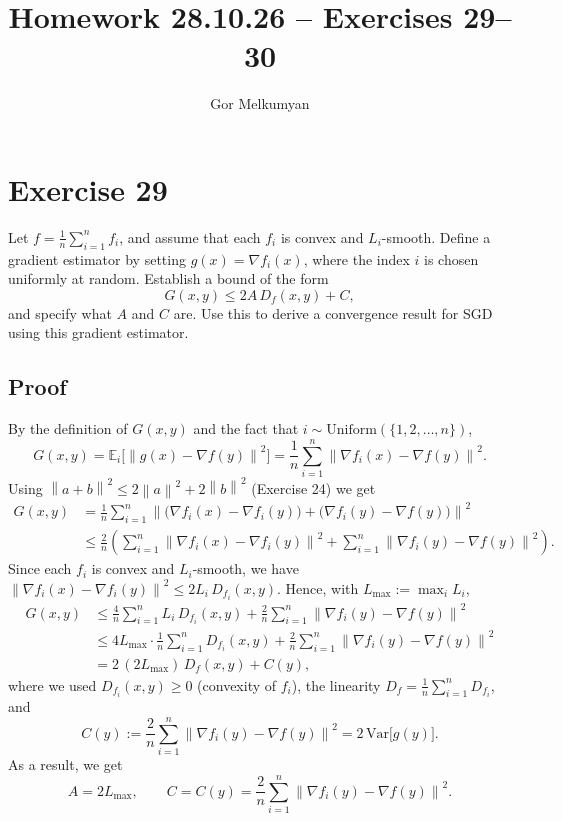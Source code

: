 \documentclass[11pt,a4paper]{article}
\title{Homework 28.10.26 -- Exercises 29--30}
\author{Gor Melkumyan}
\date{}
\newcommand{\E}{\mathbb{E}}
\newcommand{\norm}[1]{\left\| #1 \right\|}
\begin{document}
\maketitle

\section*{Exercise 29}

Let $f = \frac{1}{n}\sum_{i=1}^n f_i$, and assume that each $f_i$ is convex and $L_i$-smooth.
Define a gradient estimator by setting $g(x) = \nabla f_i(x)$, where the index $i$ is chosen
uniformly at random. Establish a bound of the form
\[
  G(x,y) \le 2A\,D_f(x,y) + C,
\]
and specify what $A$ and $C$ are. Use this to derive a convergence result for SGD using this
gradient estimator.

\subsection*{Proof}
By the definition of $G(x,y)$ and the fact that $i \sim \mathrm{Uniform}(\{1,2,\dots,n\})$,
\[
  G(x,y) = \E_i\bigl[\norm{g(x) - \nabla f(y)}^2\bigr]
  = \frac{1}{n}\sum_{i=1}^n \norm{\nabla f_i(x) - \nabla f(y)}^2 .
\]
Using $\norm{a+b}^2 \le 2\norm{a}^2 + 2\norm{b}^2$ (Exercise 24) we get
\begin{align*}
  G(x,y)
  &= \frac{1}{n}\sum_{i=1}^n \norm{\bigl(\nabla f_i(x) - \nabla f_i(y)\bigr) + \bigl(\nabla f_i(y) - \nabla f(y)\bigr)}^2 \\
  &\le \frac{2}{n}\left(\sum_{i=1}^n \norm{\nabla f_i(x) - \nabla f_i(y)}^2
     + \sum_{i=1}^n \norm{\nabla f_i(y) - \nabla f(y)}^2\right).
\end{align*}
Since each $f_i$ is convex and $L_i$-smooth, we have
$\norm{\nabla f_i(x) - \nabla f_i(y)}^2 \le 2L_i\,D_{f_i}(x,y)$. Hence, with
$L_{\max} := \max_i L_i$,
\begin{align*}
  G(x,y)
  &\le \frac{4}{n}\sum_{i=1}^n L_i\,D_{f_i}(x,y) + \frac{2}{n}\sum_{i=1}^n \norm{\nabla f_i(y) - \nabla f(y)}^2 \\
  &\le 4L_{\max}\cdot\frac{1}{n}\sum_{i=1}^n D_{f_i}(x,y) + \frac{2}{n}\sum_{i=1}^n \norm{\nabla f_i(y) - \nabla f(y)}^2 \\
  &= 2\,(2L_{\max})\,D_f(x,y) + C(y),
\end{align*}
where we used $D_{f_i}(x,y) \ge 0$ (convexity of $f_i$), the linearity
$D_f = \frac{1}{n}\sum_{i=1}^n D_{f_i}$, and
\[
  C(y) := \frac{2}{n}\sum_{i=1}^n \norm{\nabla f_i(y) - \nabla f(y)}^2 = 2\,\mathrm{Var}\bigl[g(y)\bigr].
\]
As a result, we get
\[
  A = 2L_{\max}, \qquad C = C(y) = \frac{2}{n}\sum_{i=1}^n \norm{\nabla f_i(y) - \nabla f(y)}^2 .
\]
\end{document}
